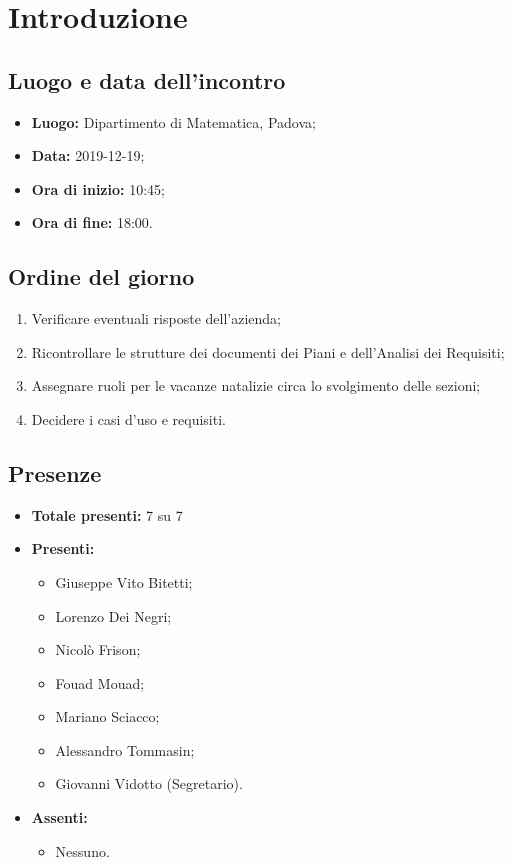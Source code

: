 \section*{Introduzione}

\subsection*{Luogo e data dell'incontro}
	\begin{itemize}
		\item \textbf{Luogo:} Dipartimento di Matematica, Padova;
		\item \textbf{Data:} 2019-12-19;
		\item \textbf{Ora di inizio:} 10:45;
		\item \textbf{Ora di fine:} 18:00.
	\end{itemize}

\subsection*{Ordine del giorno}
	\begin{enumerate}
		\item Verificare eventuali risposte dell'azienda;
		\item  Ricontrollare le strutture dei documenti dei Piani e dell'Analisi dei Requisiti;
		\item  Assegnare ruoli per le vacanze natalizie circa lo svolgimento delle sezioni;
		\item  Decidere i casi d'uso e requisiti.
	\end{enumerate}

\subsection*{Presenze}
	\begin{itemize}
		\item \textbf{Totale presenti:} 7 su 7
		\item \textbf{Presenti: }
			\begin{itemize}			
				\item Giuseppe Vito Bitetti;
				\item Lorenzo Dei Negri;
				\item Nicolò Frison;
				\item Fouad Mouad;
				\item Mariano Sciacco;
				\item Alessandro Tommasin;
				\item Giovanni Vidotto (Segretario).
			\end{itemize}
		\item \textbf{Assenti: } 
			\begin{itemize}	
				\item Nessuno.
			\end{itemize}
	\end{itemize}


